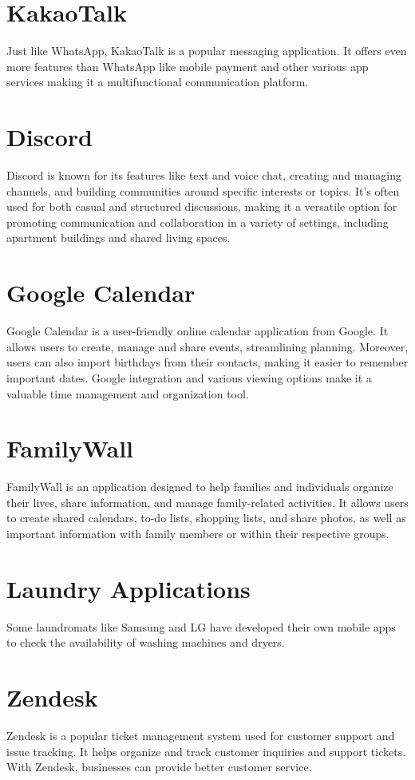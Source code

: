 \documentclass[conference]{IEEEtran}
\begin{document}
\section*{KakaoTalk}
Just like WhatsApp, KakaoTalk is a popular messaging application. It offers even more features than WhatsApp like mobile payment and other various app services making it a multifunctional communication platform.
\section*{Discord}
Discord is known for its features like text and voice chat, creating and managing channels, and building communities around specific interests or topics. It's often used for both casual and structured discussions, making it a versatile option for promoting communication and collaboration in a variety of settings, including apartment buildings and shared living spaces.
\section*{Google Calendar}
Google Calendar is a user-friendly online calendar application from Google. It allows users to create, manage and share events, streamlining planning. Moreover, users can also import birthdays from their contacts, making it easier to remember important dates. Google integration and various viewing options make it a valuable time management and organization tool.
\section*{FamilyWall}
FamilyWall is an application designed to help families and individuals organize their lives, share information, and manage family-related activities. It allows users to create shared calendars, to-do lists, shopping lists, and share photos, as well as important information with family members or within their respective groups.
\section*{Laundry Applications}
Some laundromats like Samsung and LG have developed their own mobile apps to check the availability of washing machines and dryers.
\section*{Zendesk}
Zendesk is a popular ticket management system used for customer support and issue tracking. It helps organize and track customer inquiries and support tickets. With Zendesk, businesses can provide better customer service.
\end{document}
